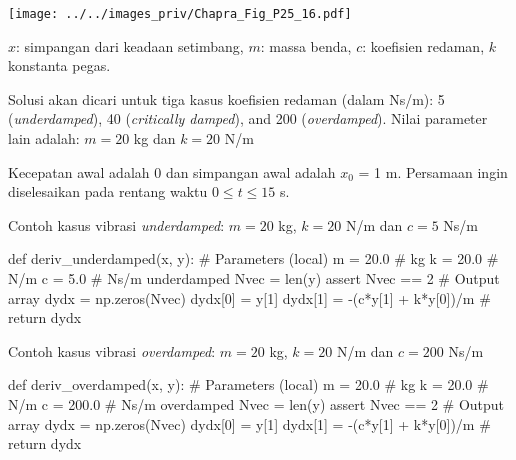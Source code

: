 \begin{frame}


{\centering
\texttt{[image: ../../images\_priv/Chapra\_Fig\_P25\_16.pdf]}
\par}

$x$: simpangan dari keadaan setimbang, $m$: massa benda, $c$: koefisien redaman, $k$ konstanta pegas.

Solusi akan dicari untuk tiga kasus koefisien redaman (dalam Ns/m):
5 (\textit{underdamped}), 40 (\textit{critically damped}), and 200 (\textit{overdamped}).
Nilai parameter lain adalah: $m = 20$ kg dan $k = 20$ N/m

Kecepatan awal adalah 0 dan simpangan awal adalah $x_0$ = 1 m. Persamaan
ingin diselesaikan pada rentang waktu $0 \leq t \leq 15$ s.

\end{frame}



\begin{frame}[fragile]

Contoh kasus vibrasi \textit{underdamped}: $m = 20$ kg, $k = 20$ N/m dan $c = 5$ Ns/m

\begin{pythoncode}
def deriv_underdamped(x, y):
    # Parameters (local)
    m = 20.0   # kg
    k = 20.0   # N/m    
    c = 5.0    # Ns/m underdamped
    Nvec = len(y)
    assert Nvec == 2
    # Output array
    dydx = np.zeros(Nvec)
    dydx[0] = y[1]
    dydx[1] = -(c*y[1] + k*y[0])/m
    #
    return dydx
\end{pythoncode}

\end{frame}



\begin{frame}[fragile]

Contoh kasus vibrasi \textit{overdamped}: $m = 20$ kg, $k = 20$ N/m dan $c = 200$ Ns/m

\begin{pythoncode}
def deriv_overdamped(x, y):
    # Parameters (local)
    m = 20.0   # kg
    k = 20.0   # N/m    
    c = 200.0  # Ns/m overdamped
    Nvec = len(y)
    assert Nvec == 2
    # Output array
    dydx = np.zeros(Nvec)
    dydx[0] = y[1]
    dydx[1] = -(c*y[1] + k*y[0])/m
    #
    return dydx
\end{pythoncode}

\end{frame}




